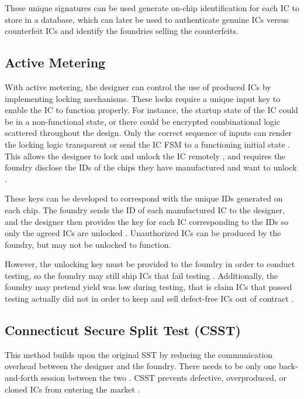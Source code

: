 \documentclass{IEEEtran}
\begin{document}
These unique signatures can be used generate on-chip identification for each IC to store in a database, which can later be used to authenticate genuine ICs versus counterfeit ICs \cite{guin2014counterfeit} and identify the foundries selling the counterfeits. 



\subsection{Active Metering}

With active metering, the designer can control the use of produced ICs by implementing locking mechanisms. These locks require a unique input key to enable the IC to function properly. For instance, the startup state of the IC could be in a non-functional state, or there could be encrypted combinational logic scattered throughout the design. Only the correct sequence of inputs can render the locking logic transparent or send the IC FSM to a functioning initial state \cite{tehranipoor2015counterfeit}. This allows the designer to lock and unlock the IC remotely \cite{CSST}, and requires the foundry disclose the IDs of the chips they have manufactured and want to unlock \cite{SST}. 

These keys can be developed to correspond with the unique IDs generated on each chip. The foundry sends the ID of each manufactured IC to the designer, and the designer then provides the key for each IC corresponding to the IDs so only the agreed ICs are unlocked \cite{guin2014counterfeit}. Unauthorized ICs can be produced by the foundry, but may not be unlocked to function.

However, the unlocking key must be provided to the foundry in order to conduct testing, so the foundry may still ship ICs that fail testing \cite{SST}. Additionally, the foundry may pretend yield was low during testing, that is claim ICs that passed testing actually did not in order to keep and sell defect-free ICs out of contract \cite{CSST}.

\subsection{Connecticut Secure Split Test (CSST)}

This method builds upon the original SST by reducing the communication overhead between the designer and the foundry. There needs to be only one back-and-forth session between the two \cite{CSST}. CSST prevents defective, overproduced, or cloned ICs from entering the market \cite{proceedings}. 
\end{document}
